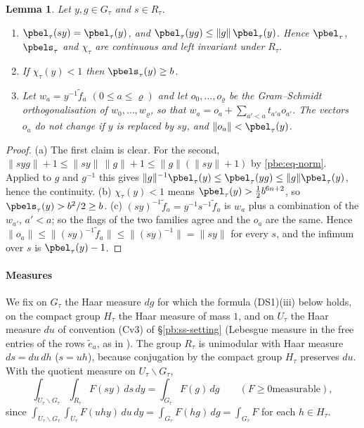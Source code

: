 \documentclass[10pt]{amsart}
\newtheorem{lemma}[theorem]{Lemma}
\theoremstyle{definition}
\theoremstyle{remark}
\begin{document}
\begin{lemma}\label{pbe:len}
Let $y,g\in G_\tau$ and $s\in R_\tau$.
\begin{enumerate}
\item[(a)] $\pbel_\tau(sy)=\pbel_\tau(y)$, and $\pbel_\tau(yg)\le\|g\|\,\pbel_\tau(y)$. Hence
$\pbel_\tau$, $\pbels_\tau$ and $\chi_\tau$ are continuous and left invariant under $R_\tau$.
\item[(b)] If $\chi_\tau(y)<1$ then $\pbels_\tau(y)\ge b$.
\item[(c)] Let $w_a=y^{-1}\tilde f_a$ $(0\le a\le\varrho)$ and let $o_0,\dots,o_\varrho$ be the
Gram--Schmidt orthogonalisation of $w_0,\dots,w_\varrho$, so that $w_a=o_a+\sum_{a'<a}t_{a'a}o_{a'}$.
The vectors $o_a$ do not change if $y$ is replaced by $sy$, and $\|o_a\|<\pbel_\tau(y)$.
\end{enumerate}
\end{lemma}
\begin{proof}
(a) The first claim is clear. For the second, $\|s yg\|+1\le\|sy\|\,\|g\|+1\le\|g\|(\|sy\|+1)$ by
\eqref{pbe:eq-norm}. Applied to $g$ and $g^{-1}$ this gives $\|g\|^{-1}\pbel_\tau(y)\le\pbel_\tau(yg)
\le\|g\|\pbel_\tau(y)$, hence the continuity. (b) $\chi_\tau(y)<1$ means $\pbel_\tau(y)>\frac12b^{6n+
2}$, so $\pbels_\tau(y)>b^2/2\ge b$. (c) $(sy)^{-1}\tilde f_a=y^{-1}s^{-1}\tilde f_a$ is $w_a$ plus
a combination of the $w_{a'}$, $a'<a$; so the flags of the two families agree and the $o_a$ are the
same. Hence $\|o_a\|\le\|(sy)^{-1}\tilde f_a\|\le\|(sy)^{-1}\|=\|sy\|$ for every $s$, and the
infimum over $s$ is $\pbel_\tau(y)-1$.
\end{proof}

\paragraph*{Measures}
We fix on $G_\tau$ the Haar measure $dg$ for which the formula \textup{(DS1)(iii)} below holds, on
the compact group $H_\tau$ the Haar measure of mass $1$, and on $U_\tau$ the Haar measure $du$ of
convention (Cv3) of \S\ref{pb:ss-setting} (Lebesgue measure in the free entries of the rows $\tilde e_a$,
as in {\cite[\S4.1]{P52}}). The
group $R_\tau$ is unimodular with Haar measure $ds=du\,dh$ ($s=uh$), because conjugation by the
compact group $H_\tau$ preserves $du$. With the quotient measure on $U_\tau\backslash G_\tau$,
\begin{equation}\label{pbe:eq-unfoldR}
\int_{U_\tau\backslash G_\tau}\int_{R_\tau}F(sy)\,ds\,dy=\int_{G_\tau}F(g)\,dg\qquad(F\ge0\text{
measurable}),
\end{equation}
since $\int_{U_\tau\backslash G_\tau}\int_{U_\tau}F(uhy)\,du\,dy=\int_{G_\tau}F(hg)\,dg=\int_{G_\tau}F$
for each $h\in H_\tau$.
\end{document}
